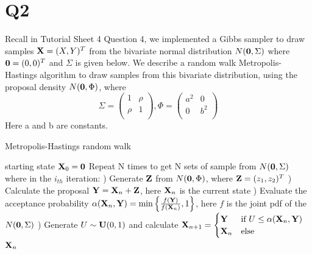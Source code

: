 \documentclass{article}
\begin{document}
\section*{Q2}
Recall in Tutorial Sheet 4 Question 4, we implemented a Gibbs sampler to draw samples $\bold{X}=(X,Y)^T$ from the bivariate normal distribution $N(\bold{0},\Sigma)$ where $\bold{0} = (0, 0)^T$ and $\Sigma$ is given below. We describe a random walk Metropolis-Hastings algorithm to draw samples from this bivariate distribution, using the proposal density $N(\bold{0}, \Phi)$, where
$$\Sigma=\begin{pmatrix}
1 & \rho\\
\rho & 1\\
\end{pmatrix}, 
\Phi=\begin{pmatrix}
a^2 & 0\\
0 & b^2\\
\end{pmatrix}$$
Here a and b are constants.
\begin{algorithm}
\caption{Metropolis-Hastings random walk}\label{alg:cap}
\begin{algorithmic}
\Require starting state $\bold{X}_0=\bold{0}$
\State Repeat N times to get N sets of sample from $N(\bold{0}, \Sigma)$ where in the $i_{th}$ iteration:
) Generate $\bold{Z}$ from $N(\bold{0},\Phi)$, where $\bold{Z}=(z_1,z_2)^T$
) Calculate the proposal $\bold{Y}=\bold{X}_n+\bold{Z}$, here $\bold{X}_n$ is the current state
) Evaluate the acceptance probability $\alpha(\bold{X}_n,\bold{Y})=\min\left\{\frac{f(\bold{Y})}{f(\bold{X}_n)},1\right\}$, here $f$ is the joint pdf of the $N(\bold{0},\Sigma)$
) Generate $U\sim\bold{U}(0,1)$ and calculate $\bold{X}_{n+1}=\begin{cases}
\bold{Y} & \text{if } U\leq\alpha(\bold{X}_n,\bold{Y})\\
\bold{X}_n & \text{else}
\end{cases}$
\newline
\Return $\bold{X}_n$
\end{algorithmic}
\end{algorithm}
\end{document}
